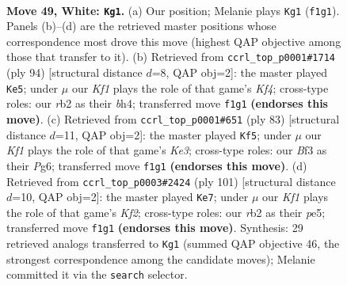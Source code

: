 \documentclass[11pt]{article}
\begin{document}
\clearpage

\begin{figure}[p]\centering
\begin{subfigure}{0.46\textwidth}\centering
\resizebox{\linewidth}{!}{%
\newchessgame
\chessboard[
  setfen={4k3/8/8/4p1p1/5p2/5B2/1r6/5K2 w - - 9 49},
  showmover=false,
  pgfstyle=straightmove, color=movearrow, markmove={f1-g1}
]}
\caption{}
\end{subfigure}\hfill
\begin{subfigure}{0.46\textwidth}\centering
\resizebox{\linewidth}{!}{%
\newchessgame
\chessboard[
  setfen={6k1/8/8/1p6/2p2K1b/2B5/8/8 w - - 0 48},
  showmover=false,
  pgfstyle=straightmove, color=movearrow, markmove={f4-e5}
]}
\caption{}
\end{subfigure}
\\[4pt]
\begin{subfigure}{0.46\textwidth}\centering
\resizebox{\linewidth}{!}{%
\newchessgame
\chessboard[
  setfen={8/7R/4k1p1/6P1/1P3P2/r7/8/4K3 b - - 0 42},
  showmover=false,
  pgfstyle=straightmove, color=movearrow, markmove={e6-f5}
]}
\caption{}
\end{subfigure}\hfill
\begin{subfigure}{0.46\textwidth}\centering
\resizebox{\linewidth}{!}{%
\newchessgame
\chessboard[
  setfen={8/5k2/8/4P2P/5b2/1K3P2/6P1/8 b - - 2 51},
  showmover=false,
  pgfstyle=straightmove, color=movearrow, markmove={f7-e7}
]}
\caption{}
\end{subfigure}
\caption{\textbf{Move 49, White: \texttt{Kg1}.} (a) Our position; Melanie plays \texttt{Kg1} (\texttt{f1g1}). Panels (b)--(d) are the retrieved master positions whose correspondence most drove this move (highest QAP objective among those that transfer to it). (b) Retrieved from \texttt{ccrl\_top\_p0001\#1714} (ply 94) [structural distance $d$=8, QAP obj=2]: the master played \texttt{Ke5}; under $\mu$ our \emph{Kf1} plays the role of that game's \emph{Kf4}; cross-type roles: our \emph{r}b2 as their \emph{b}h4; transferred move \texttt{f1g1} \textbf{(endorses this move)}. (c) Retrieved from \texttt{ccrl\_top\_p0001\#651} (ply 83) [structural distance $d$=11, QAP obj=2]: the master played \texttt{Kf5}; under $\mu$ our \emph{Kf1} plays the role of that game's \emph{Ke3}; cross-type roles: our \emph{B}f3 as their \emph{P}g6; transferred move \texttt{f1g1} \textbf{(endorses this move)}. (d) Retrieved from \texttt{ccrl\_top\_p0003\#2424} (ply 101) [structural distance $d$=10, QAP obj=2]: the master played \texttt{Ke7}; under $\mu$ our \emph{Kf1} plays the role of that game's \emph{Kf2}; cross-type roles: our \emph{r}b2 as their \emph{p}e5; transferred move \texttt{f1g1} \textbf{(endorses this move)}. Synthesis: 29 retrieved analogs transferred to \texttt{Kg1} (summed QAP objective 46, the strongest correspondence among the candidate moves); Melanie committed it via the \texttt{search} selector.}
\label{fig:thought-m96}
\end{figure}
\end{document}
